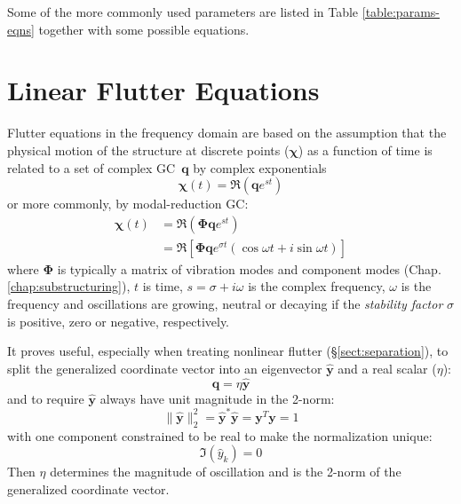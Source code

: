 \documentclass[10pt,openany,twoside]{book}
\numberwithin{equation}{section}   %
\newcommand{\Newterm}[1]{{\em #1}}
\newcommand{\Matrix}[1]{\boldsymbol{#1}}
\newcommand{\Vector}[1]{\boldsymbol{#1}}
\newcommand{\Gc}{GC}
\newcommand{\Sectref}[1]{\S\ref{#1}}
\newcommand{\Chapref}[1]{Chap. \ref{#1}}
\newcommand{\Tableref}[1]{Table \ref{#1}}
\begin{document}
Some of the more commonly used parameters are
listed in \Tableref{table:params-eqns} together with some possible equations.



\section{Linear Flutter Equations}\label{sect:complexflutter}
Flutter equations in the frequency domain are based on
the assumption that the physical motion of the structure at discrete points
($\Vector{\chi}$) as a function of time
is related to a set of complex \Gc\
$\Vector{q}$ by complex exponentials
\begin{equation}
\Vector{\chi}(t) = \Re(\Vector{q}e^{st})
\end{equation}
or more commonly, by modal-reduction \Gc:
\begin{align} \label{eqn:motion}
\Vector{\chi}(t) & =  \Re \left(\Matrix{\Phi}\Vector{q}e^{st}\right) \nonumber \\
              & =  \Re \left[\Matrix{\Phi}\Vector{q} e^{\sigma t}
				  			\left(\cos \omega t + i \sin \omega t \right) \right]
\end{align}
where $\Matrix{\Phi}$ \index{=Phi@$\Matrix{\Phi}$!modal reduction} is typically
a matrix of vibration modes and component modes (\Chapref{chap:substructuring}),
$t$ is time, $s = \sigma + i\omega$ is the complex frequency, $\omega$
is the frequency and oscillations are growing, neutral or decaying if the
\Newterm{stability factor} $\sigma$ is positive, zero or negative, respectively.

It proves useful, especially when treating nonlinear flutter
(\Sectref{sect:separation}), to split the generalized
coordinate vector into an eigenvector $\hat{\Vector{y}}$
and a real scalar ($\eta$):
\begin{equation}\label{eqn:gcsplit}
	\Vector{q} = \eta \hat{\Vector{y}}
\end{equation}
and to require $\hat{\Vector{y}}$ always have unit magnitude in the 2-norm:
\begin{equation}\label{eqn:normalization}
	\|\hat{\Vector{y}}\|_2^2 = \hat{\Vector{y}}^*\hat{\Vector{y}} = \Vector{y}^T\Vector{y} = 1
\end{equation}
with one component constrained to be real to make the normalization unique:
\begin{equation}\label{eqn:phase}
 	\Im(\hat{y}_k) = 0
\end{equation}
Then $\eta$ determines the magnitude of oscillation and is the 2-norm
of the generalized coordinate vector.
\end{document}
